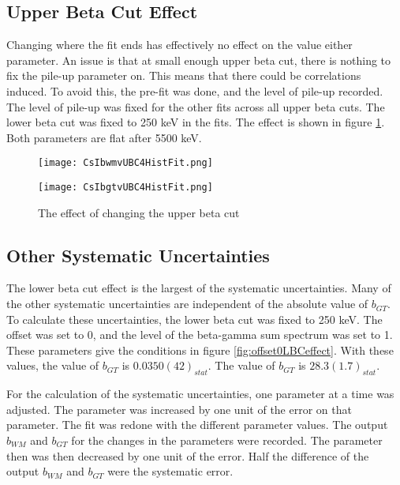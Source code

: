 \documentclass[../MaxHughesThesis.tex]{subfiles}
\begin{document}
\subsection{Upper Beta Cut Effect}

Changing where the fit ends has effectively no effect on the value either parameter.
An issue is that at small enough upper beta cut, there is nothing to fix the pile-up parameter on. 
This means that there could be correlations induced.
To avoid this, the  pre-fit was done, and the level of pile-up recorded.
The level of pile-up was fixed for the other fits across all upper beta cuts.
The lower beta cut was fixed to 250 keV in the fits. 
The effect is shown in figure \ref{fig:UBCEffect}.
Both parameters are flat after 5500 keV.

\begin{figure}
    \centering
    \begin{minipage}{0.50\textwidth}
        \centerline{\texttt{[image: CsIbwmvUBC4HistFit.png]}}
    \end{minipage}\hfill
    \begin{minipage}{0.50\textwidth}
        \centerline{\texttt{[image: CsIbgtvUBC4HistFit.png]}}
    \end{minipage}
    \caption{The effect of changing the upper beta cut}
    \label{fig:UBCEffect}
\end{figure}


\subsection{Other Systematic Uncertainties}

The lower beta cut effect is the largest of the systematic uncertainties.
Many of the other systematic uncertainties are independent of the absolute value of $b_{GT}$.
To calculate these uncertainties, the lower beta cut was fixed to 250 keV.
The offset was set to 0, and the level of the beta-gamma sum spectrum was set to 1.
These parameters give the conditions in figure \ref{fig:offset0LBCeffect}.
With these values, the value of $b_{GT}$ is $0.0350 (42)_{stat}$.
The value of $b_{GT}$ is $28.3 (1.7)_{stat}$.

For the calculation of the systematic uncertainties, one parameter at a time was adjusted.
The parameter was increased by one unit of the error on that parameter.
The fit was redone with the different parameter values.
The output $b_{WM}$ and $b_{GT}$ for the changes in the parameters were recorded.
The parameter then was then decreased by one unit of the error.
Half the difference of the output $b_{WM}$ and $b_{GT}$ were the systematic error.
\end{document}
